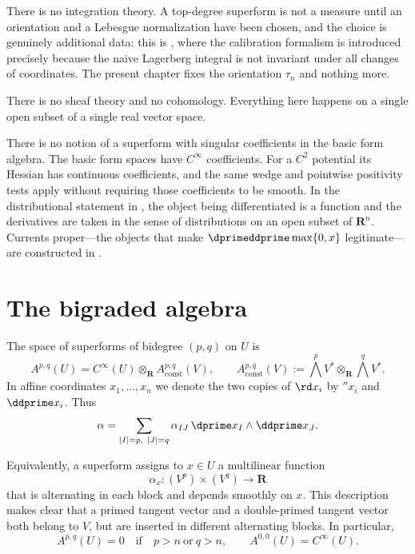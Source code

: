 There is no integration theory.  A top-degree superform is not a measure
until an orientation and a Lebesgue normalization have been chosen, and the
choice is genuinely additional data: this is
, where the calibration formalism is
introduced precisely because the naive Lagerberg integral is not invariant
under all changes of coordinates.  The present chapter fixes the orientation
$\tau_n$ and nothing more.

There is no sheaf theory and no cohomology.  Everything here happens on a
single open subset of a single real vector space.

There is no notion of a superform with singular coefficients in the basic form algebra.  The
basic form spaces have $C^\infty$ coefficients.  For a $C^2$ potential its
Hessian has continuous coefficients, and the same wedge and pointwise
positivity tests apply without requiring those coefficients to be smooth.
In the distributional statement in , the object
being differentiated is a function and the derivatives are taken in the sense
of distributions on an open subset of $\mathbf R^n$.  Currents proper---the
objects that make $\dprimeddprime\max\{0,x\}$ legitimate---are constructed in
.

\section{The bigraded algebra}
\label{sec:ch09-algebra}

\begin{definition}
\label{def:ch09-superform-space}
The space of superforms of bidegree $(p,q)$ on $U$ is
\[
 A^{p,q}(U)=C^\infty(U)\otimes_{\mathbf R}A_{\mathrm{const}}^{p,q}(V),
 \qquad
 A_{\mathrm{const}}^{p,q}(V)
 :=\bigwedge^pV^*\otimes_{\mathbf R}\bigwedge^qV^*.
\]
In affine coordinates $x_1,\ldots,x_n$ we denote the two copies of $\rd x_i$ by
$\dprime x_i$ and $\ddprime x_i$. Thus
\[
 \alpha=\sum_{|I|=p,\ |J|=q}\alpha_{IJ}\,
 \dprime x_I\wedge \ddprime x_J.
\]
\end{definition}

Equivalently, a superform assigns to $x\in U$ a multilinear function
\[
 \alpha_x:(V^p)\times(V^q)\longrightarrow\mathbf R
\]
that is alternating in each block and depends smoothly on $x$.  This
description makes clear that a primed tangent vector and a double-primed
tangent vector both belong to $V$, but are inserted in different alternating
blocks.  In particular,
\[
 A^{p,q}(U)=0\quad\text{if}\quad p>n\ \text{or}\ q>n,
 \qquad
 A^{0,0}(U)=C^\infty(U).
\]

